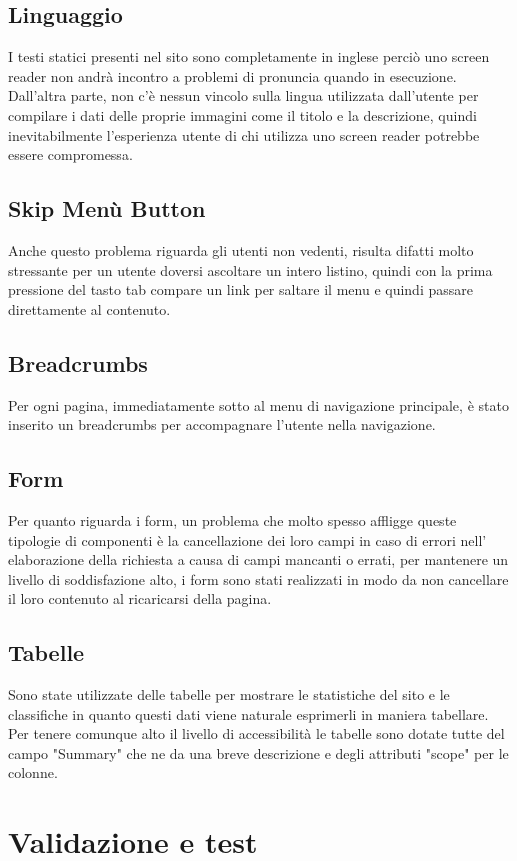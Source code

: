 \documentclass[openany, a4paper, 12pt]{report}
\begin{document}
		\section{Linguaggio}
		I testi statici presenti nel sito sono completamente in inglese perciò uno screen reader non andrà incontro a problemi di pronuncia quando in esecuzione. Dall'altra parte, non c'è nessun vincolo sulla lingua utilizzata dall'utente per compilare i dati delle proprie immagini come il titolo e la descrizione, quindi inevitabilmente l'esperienza utente di chi utilizza uno screen reader potrebbe essere compromessa.
		\section{Skip Menù Button}
		Anche questo problema riguarda gli utenti non vedenti, risulta difatti molto stressante per un utente doversi ascoltare un intero listino, quindi con la prima pressione del tasto tab compare un link per saltare il menu e quindi passare direttamente al contenuto.
		\section{Breadcrumbs}
		Per ogni pagina, immediatamente sotto al menu di navigazione principale, è stato inserito un breadcrumbs per accompagnare l'utente nella navigazione.
		\section{Form}
	Per quanto riguarda i form, un problema che molto spesso affligge queste tipologie di componenti è la cancellazione dei loro campi in caso di errori nell' elaborazione della richiesta a causa di campi mancanti o errati, per mantenere un livello di soddisfazione alto, i form sono stati realizzati in modo da non cancellare il loro contenuto al ricaricarsi della pagina.
		\section{Tabelle}
		Sono state utilizzate delle tabelle per mostrare le statistiche del sito e le classifiche in quanto questi dati viene naturale esprimerli in maniera tabellare. Per tenere comunque alto il livello di accessibilità le tabelle sono dotate tutte del campo "Summary" che ne da una breve descrizione e degli attributi "scope" per le colonne.


	\chapter{Validazione e test}
\end{document}
